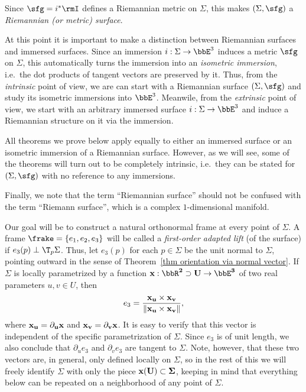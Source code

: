 Since $\sfg= i^\ast \rmI$ defines a Riemannian metric on $\Sigma$, this makes $(\Sigma,\sfg)$ a \emph{Riemannian (or metric) surface}.

\begin{rem}
    At this point it is important to make a distinction between Riemannian surfaces and immersed surfaces. Since an immersion $i:\Sigma\to \bbE^3$ induces a metric $\sfg$ on $\Sigma$, this automatically turns the immersion into an \emph{isometric immersion}, i.e.\ the dot products of tangent vectors are preserved by it. Thus, from the \emph{intrinsic} point of view, we are can start with a Riemannian surface $(\Sigma,\sfg)$ and study its isometric immersions into $\bbE^3$. Meanwile, from the \emph{extrinsic} point of view, we start with an arbitrary immersed surface $i:\Sigma\to \bbE^3$ and induce a Riemannian structure on it via the immersion. 
    
    All theorems we prove below apply equally to either an immersed surface or an isometric immersion of a Riemannian surface. However, as we will see, some of the theorems will turn out to be completely intrinsic, i.e.\ they can be stated for $(\Sigma,\sfg)$ with no reference to any immersions.

    Finally, we note that the term ``Riemannian surface'' should not be confused with the term ``Riemann surface'', which is a complex $1$-dimensional manifold.
\end{rem}

Our goal will be to construct a natural orthonormal frame at every point of $\Sigma$. A frame $\frake=\{e_1,e_2,e_3\}$ will be called a \emph{first-order adapted lift} (of the surface) if $e_3(p)\perp \T_p \Sigma$. 
Thus, let $e_3(p)$ for each $p\in\Sigma$ be the unit normal to $\Sigma$, pointing outward in the sense of Theorem~\ref{thm orientation via normal vector}.  If $\Sigma$ is locally parametrized by a function $\bf{ x}: \bbR^2\supset U\to\bbE^3$ of two real parameters $u,v\in U$, then 
\[e_3=\frac{\bf{ x}_u\times \bf{x}_v}{\lVert \bf{x}_u\times \bf{x}_v\rVert},\]
where $\bf{x}_u=\partial_u \bf{x}$ and $\bf{x}_v=\partial_v \bf{x}$. It is easy to verify that this vector is independent of the specific parametrization of $\Sigma$. Since $e_3$ is of unit length, we also conclude that $\partial_u e_3$ and $\partial_v e_3$ are tangent to $\Sigma$. Note, however, that these two vectors are, in general, only defined locally on $\Sigma$, so in the rest of this \subsect we will freely identify $\Sigma$ with only the piece $\bf{x}(U)\subset \Sigma$, keeping in mind that everything below can be repeated on a neighborhood of any point of $\Sigma$.

